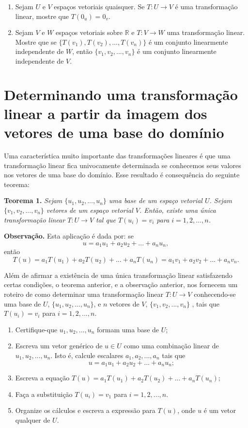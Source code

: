\begin{enumerate}
\item Sejam $U$ e $V$ espaços vetoriais  quaisquer.  Se  $T: U \rightarrow V$   é uma transformação linear, mostre que $T(0_u)=0_v$.

\item {Sejam $V$ e $W$ espaços vetoriais  sobre $\mathbb{R}$ e $T : V \rightarrow W$ uma transformação linear. Mostre que se  $\{T(v_1),T( v_2),...,T(v_n)\}$ é um conjunto linearmente independente de $W$, então $\{v_1, v_2,...,v_n\}$ é um conjunto linearmente independente de $V$.}

\end{enumerate}

\section{Determinando uma transformação linear a partir da imagem dos vetores de uma base do domínio}
 Uma característica muito importante das transformações lineares é que uma transformação linear fica univocamente determinada se conhecemos seus valores nos vetores de uma base do domínio. Esse resultado é consequência do seguinte teorema:

\vspace{0.3cm}
\noindent \textbf{Teorema 1.} \textit{Sejam $\{ u_1, u_2, ..., u_n\}$ uma base de um espaço vetorial  $U$. Sejam $\{ v_1, v_2,..., v_n\}$ vetores de um espaço vetorial $V$. Então, existe uma única transformação linear  $T: U \rightarrow V$ tal que $T(u_i)=v_i$ para $i=1,2, ..., n$. }

\vspace{0.3cm}
\noindent \textbf{Observação.} Esta aplicação é dada por: se $$ u=a_1u_1+a_2u_2+...+a_nu_n,$$  então  $$T(u)=a_1T(u_1)+a_2T(u_2)+...+a_nT(u_n)=a_1v_1+a_2v_2+...+a_nv_n.$$

Além de afirmar a existência de uma única transformação linear satisfazendo certas condições, o teorema anterior, e a observação anterior, nos fornecem um roteiro de como determinar uma transformação linear $T: U \rightarrow V$ conhecendo-se uma base de $U$,  $\{ u_1, u_2, ..., u_n\}$, e  $n$ vetores de $V$, $\{ v_1, v_2,..., v_n\}$ , tais que $T(u_i)=v_i$ para $i=1,2, ..., n$.
\begin{enumerate}
\item Certifique-que $u_1, u_2,...,u_n$ formam uma base de $U$;
\item Escreva um vetor genérico de  $u \in U$ como uma combinação linear de $u_1, u_2,...,u_n$. Isto é, calcule escalares $a_1, a_2,...,a_n$ tais que $$u=a_1u_1+ a_2u_2+...+a_nu_n;$$
\item Escreva a equação $T(u)=a_1T(u_1)+ a_2T(u_2)+...+a_nT(u_n)$;
\item Faça a substituição $T(u_i)=v_1$ para $i=1,2,...,n$.
\item Organize os cálculos e escreva a expressão para $T(u)$,  onde $u$ é um vetor qualquer de $U$.
\end{enumerate}


